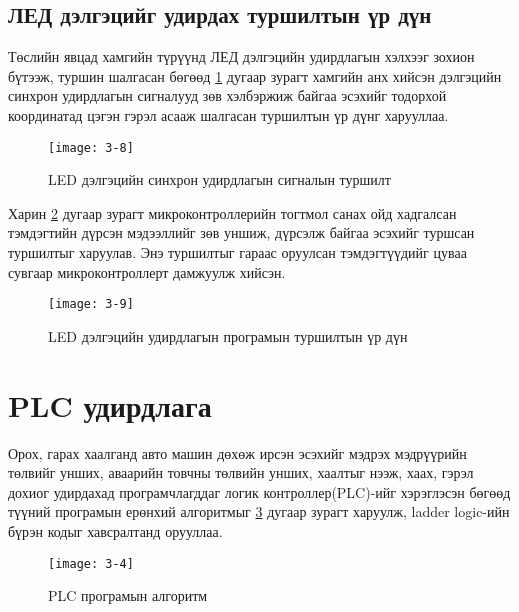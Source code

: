 \subsection{ЛЕД дэлгэцийг удирдах туршилтын үр дүн}
Төслийн явцад хамгийн түрүүнд ЛЕД дэлгэцийн удирдлагын хэлхээг зохион бүтээж, туршин шалгасан бөгөөд \ref{fig:3-5} дугаар зурагт хамгийн анх хийсэн дэлгэцийн синхрон удирдлагын сигналууд зөв хэлбэржиж байгаа эсэхийг тодорхой координатад цэгэн гэрэл асааж шалгасан туршилтын үр дүнг харууллаа. 
\begin{figure}[!ht]
	\centering
	\begin{turn}{90}
	\texttt{[image: 3-8]}
	\end{turn}
	\caption{LED дэлгэцийн синхрон удирдлагын сигналын туршилт}
	\label{fig:3-5}
\end{figure}

Харин \ref{fig:3-6} дугаар зурагт микроконтроллерийн тогтмол санах ойд хадгалсан тэмдэгтийн дүрсэн мэдээллийг зөв уншиж, дүрсэлж байгаа эсэхийг туршсан туршилтыг харуулав. Энэ туршилтыг гараас оруулсан тэмдэгтүүдийг цуваа сувгаар микроконтроллерт дамжуулж хийсэн. 

 \begin{figure}[!ht]
 	\centering
 	\texttt{[image: 3-9]}
 	\caption{LED дэлгэцийн удирдлагын програмын туршилтын үр дүн}
 	\label{fig:3-6}
 \end{figure}

\section{PLC удирдлага}
Орох, гарах хаалганд авто машин дөхөж ирсэн эсэхийг мэдрэх мэдрүүрийн төлвийг унших, аваарийн товчны төлвийн унших, хаалтыг нээж, хаах, гэрэл дохиог удирдахад програмчлагддаг логик контроллер(PLC)-ийг хэрэглэсэн бөгөөд түүний програмын ерөнхий алгоритмыг \ref{fig:3-7} дугаар зурагт харуулж, ladder logic-ийн бүрэн кодыг хавсралтанд орууллаа. \\
 \begin{figure}[!ht]
	\centering
	\texttt{[image: 3-4]}
	\caption{PLC програмын алгоритм}
	\label{fig:3-7}
\end{figure}

